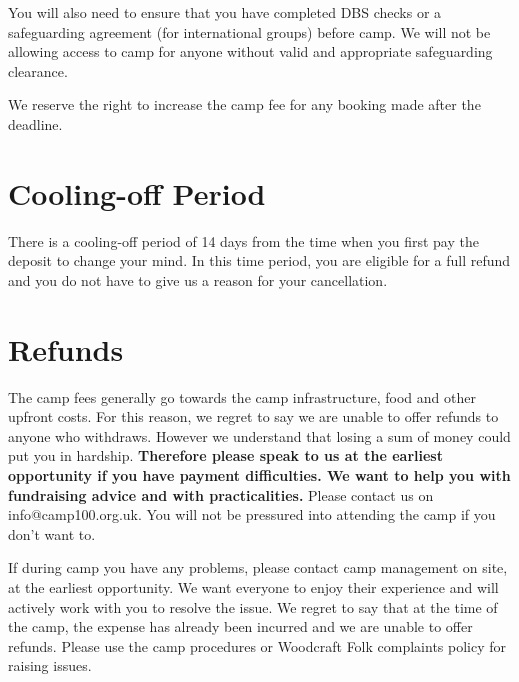 \documentclass[a4paper, 11pt]{report}
\begin{document}
You will also need to ensure that you have completed DBS checks or a safeguarding agreement (for international groups) before camp. We will not be allowing access to camp for anyone without valid and appropriate safeguarding clearance. 

We reserve the right to increase the camp fee for any booking made after the deadline.

\section{Cooling-off Period}
There is a cooling-off period of 14 days from the time when you first pay the deposit to change your mind. In this time period, you are eligible for a full refund and you do not have to give us a reason for your cancellation. 

\section{Refunds}
The camp fees generally go towards the camp infrastructure, food and other upfront costs.  For this reason, we regret to say we are unable to offer refunds to anyone who withdraws. However we understand that losing a sum of money could put you in hardship. \textbf{Therefore please speak to us at the earliest opportunity if you have payment difficulties. We want to help you with fundraising advice and with practicalities.} Please contact us on info@camp100.org.uk. You will not be pressured into attending the camp if you don't want to.
 
If during camp you have any problems, please contact camp management on site, at the earliest opportunity. We want everyone to enjoy their experience and will actively work with you to resolve the issue. We regret to say that at the time of the camp, the expense has already been incurred and we are unable to offer refunds. Please use the camp procedures or Woodcraft Folk complaints policy for raising issues.


\makedocumentbackpage
\end{document}
